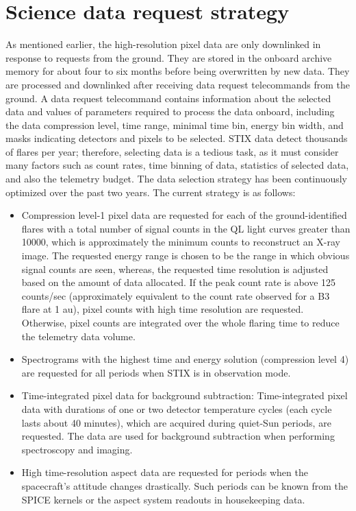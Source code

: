 \documentclass[referee]{preaa} %
\begin{document}
\section{Science data request strategy}
As mentioned earlier, the high-resolution pixel data are only downlinked in response to requests from the
ground. They are stored in the onboard archive memory for about four to six months 
before being overwritten by new data. They are processed and downlinked 
after receiving data request telecommands from the ground. 
A data request telecommand contains information about the selected data and values of parameters  required to process the data onboard, including the data compression level, 
time range, minimal time bin, energy bin width, 
and  masks indicating detectors and pixels to be selected. 
STIX data detect thousands of flares per year; therefore, 
selecting data is a tedious task, as it must consider many factors
such as count rates, time binning of data, statistics of selected data, 
and also the telemetry budget. 
The data selection strategy has been continuously optimized over the past two years. The current strategy is as follows: 
\begin{itemize}
  \item  
 Compression level-1 pixel data are requested for each of the ground-identified  flares with a total number of signal counts in the QL light curves greater than 10000, which is approximately the minimum counts to reconstruct an X-ray image. 
The requested energy range is chosen to be the range in which obvious signal counts are seen,  
whereas, the requested time resolution is adjusted based on the amount of data allocated. 
If the peak count rate is above 125 counts/sec (approximately 
equivalent to the count rate observed for a B3 flare at 1 au),  pixel counts with high time resolution are requested.  Otherwise, pixel counts are integrated over the whole flaring time 
to reduce the telemetry data volume. 
 \item  Spectrograms with the highest time and energy solution (compression level 4) are requested for all periods when STIX is in observation mode. 
 \item Time-integrated pixel data for background subtraction:
Time-integrated pixel data with durations of one or two detector temperature cycles (each cycle lasts about 40 minutes), which are acquired during quiet-Sun periods, are requested. 
The data are used for background subtraction when performing spectroscopy and imaging. 
\item High time-resolution aspect data are requested for periods when the spacecraft's attitude changes drastically.
Such periods can be known from the SPICE kernels or the aspect system readouts in housekeeping data. 
\end{itemize}
\end{document}
